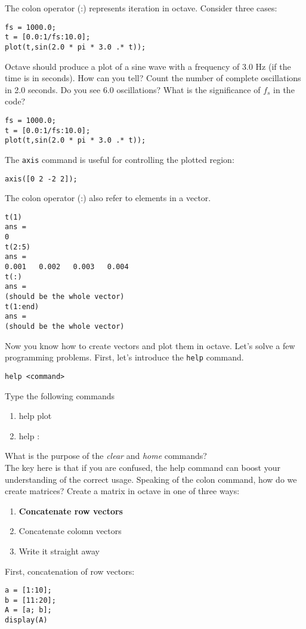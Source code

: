 \documentclass[10pt]{article}
\begin{document}
The colon operator (:) represents iteration in octave.  Consider three cases:  \\
\begin{verbatim}
fs = 1000.0;
t = [0.0:1/fs:10.0];
plot(t,sin(2.0 * pi * 3.0 .* t));
\end{verbatim}
Octave should produce a plot of a sine wave with a frequency of 3.0 Hz (if the time is in seconds).  How can you tell?  Count the number of complete oscillations in 2.0 seconds.  Do you see 6.0 oscillations?  What is the significance of $f_s$ in the code?
\begin{verbatim}
fs = 1000.0;
t = [0.0:1/fs:10.0];
plot(t,sin(2.0 * pi * 3.0 .* t));
\end{verbatim}
The \verb+axis+ command is useful for controlling the plotted region:
\begin{verbatim}
axis([0 2 -2 2]);
\end{verbatim}
The colon operator (:) also refer to elements in a vector.
\begin{verbatim}
t(1)
ans =
0
t(2:5)
ans = 
0.001   0.002   0.003   0.004
t(:)
ans = 
(should be the whole vector)
t(1:end)
ans =
(should be the whole vector)
\end{verbatim}
Now you know how to create vectors and plot them in octave.  Let's solve a few programming problems.  First, let's introduce the \verb+help+ command.
\begin{verbatim}
help <command>
\end{verbatim}
Type the following commands
\begin{enumerate}
\item help plot
\item help :
\end{enumerate}
What is the purpose of the \textit{clear} and \textit{home} commands? \\ \vspace{0.5cm}
The key here is that if you are confused, the help command can boost your understanding of the correct usage.  Speaking of the colon command, how do we create matrices?  Create a matrix in octave in one of three ways:
\begin{enumerate}
\item \textbf{Concatenate row vectors}
\item Concatenate colomn vectors
\item Write it straight away
\end{enumerate}
First, concatenation of row vectors:
\begin{verbatim}
a = [1:10];
b = [11:20];
A = [a; b];
display(A)
\end{verbatim}
\end{document}
